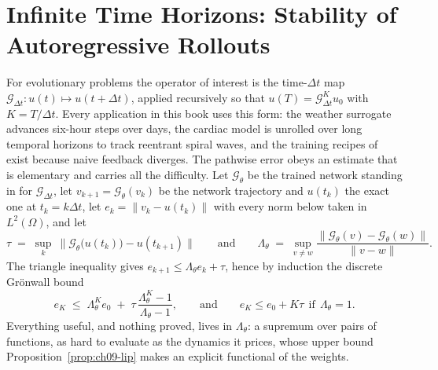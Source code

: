 \section{Infinite Time Horizons: Stability of Autoregressive Rollouts}
\label{sec:ch09-rollouts}

For evolutionary problems the operator of interest is the time-$\Delta t$ map
$\mathcal{G}_{\Delta t}: u(t)\mapsto u(t+\Delta t)$, applied recursively so that
$u(T) = \mathcal{G}_{\Delta t}^{K}u_0$ with $K=T/\Delta t$. Every application in
this book uses this form: the weather surrogate advances six-hour steps over
days, the cardiac model is unrolled over long temporal horizons to track
reentrant spiral waves, and the training
recipes of  exist
because naive feedback diverges. The pathwise error obeys an estimate that is
elementary and carries all the difficulty. Let $\mathcal{G}_\theta$ be the
trained network standing in for $\mathcal{G}_{\Delta t}$, let
$v_{k+1}=\mathcal{G}_\theta(v_k)$ be the network trajectory and $u(t_k)$ the exact
one at $t_k=k\Delta t$, let $e_k=\|v_k-u(t_k)\|$ with every norm below taken in
$L^2(\Omega)$, and let
\begin{equation}
  \tau \;=\; \sup_{k}\ \big\|\mathcal{G}_{\theta}\big(u(t_k)\big)-u(t_{k+1})\big\|
  \qquad\text{and}\qquad
  \Lambda_\theta \;=\; \sup_{v\ne w}\frac{\|\mathcal{G}_\theta(v)-\mathcal{G}_\theta(w)\|}{\|v-w\|}.
  \label{eq:ch09-onesided}
\end{equation}
The triangle inequality gives $e_{k+1}\le \Lambda_\theta e_k+\tau$, hence by
induction the discrete Gr\"onwall bound
\begin{equation}
  e_K \;\le\; \Lambda_\theta^{K}e_0 \;+\; \tau\,\frac{\Lambda_\theta^{K}-1}{\Lambda_\theta-1},
  \qquad\text{and}\qquad
  e_K \le e_0 + K\tau\ \ \text{if}\ \ \Lambda_\theta=1.
  \label{eq:ch09-gronwall}
\end{equation}
Everything useful, and nothing proved, lives in $\Lambda_\theta$: a supremum over
pairs of functions, as hard to evaluate as the dynamics it prices, whose upper
bound Proposition~\ref{prop:ch09-lip} makes an explicit functional of the
weights.

